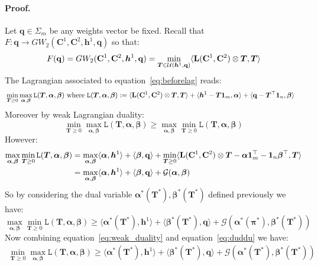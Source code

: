 \documentclass{article}
\newcommand{\scalar}[2]{\langle #1 , #2 \rangle}
\def\eqref#1{equation~\ref{#1}}
\def\vh{{\bm{h}}}
\def\mT{{\bm{T}}}
\def\alphab{\boldsymbol\alpha}
\def\betab{\boldsymbol\beta}
\def\G{\pi}
\def\GG{\boldsymbol\G}
\def\L{{\bf L}}
\def\one{{\mathbf{1}}}
\newcommand{\qbf}{\mathbf{q}}
\newcommand{\C}{\mathbf{C}}
\newcommand{\gw}{GW}
\begin{document}
	\paragraph{Proof.}
	Let $\qbf \in \Sigma_m$ be any weights vector be fixed. Recall that $F: \qbf \rightarrow \gw_2(\C^1,\C^2,\vh^1,\qbf)$ so that:
	\begin{equation}
	\label{eq:beforelag}
	F(\qbf)=\gw_2(\C^1,\C^2,\vh^1,\qbf)=\min_{\mT \in \mathcal{U}(\vh^1,\qbf)} \scalar{\L(\C^1,\C^2)\otimes \mT}{\mT}{}
	\end{equation}
	The Lagrangian associated to \eqref{eq:beforelag} reads:
	\begin{equation}
	\label{eq:lag_cond}
	\begin{split}
	&\min_{\mT \geq 0} \max_{\alphab,\betab} \texttt{L}(\mT,\alphab,\betab) \text{ where }\texttt{L}(\mT,\alphab,\betab):= \scalar{\L(\C^1,\C^2)\otimes \mT}{\mT}{}+ \scalar{\vh^1-\mT \one_m}{\alphab}{}+ \scalar{\qbf-\mT^{\top} \one_n}{\betab}{}
	\end{split}
	\end{equation}
	Moreover by weak Lagrangian duality:
	\begin{equation}
	\label{eq:weak_duality}
	\min_{\mT \geq 0} \max_{\alphab,\betab} \texttt{L}(\mT,\alphab,\betab) \geq \max_{\alphab,\betab} \min_{\mT \geq 0}  \texttt{L}(\mT,\alphab,\betab)
	\end{equation}
	However: 
	\begin{equation*}
	\begin{split}
	\max_{\alphab,\betab} \min_{\mT \geq 0}  \texttt{L}(\mT,\alphab,\betab)&=\max_{\alphab,\betab} \scalar{\alphab}{\vh^1}{}+\scalar{\betab}{\qbf}{}+ \min_{\mT \geq 0} \scalar{\L(\C^1,\C^2)\otimes \mT-\alphab \one_m^{\top}- \one_n\betab^{\top}}{\mT}{} \\
	&=\max_{\alphab,\betab} \scalar{\alphab}{\vh^1}{}+\scalar{\betab}{\qbf}{}+\mathcal{G}(\alphab,\betab)
	\end{split}
	\end{equation*}
	So by considering the dual variable $\alphab^{*}(\mT^{*}),\betab^{*}(\mT^{*})$ defined previously we have:
	\begin{equation}
	\label{eq:duddu}
	\max_{\alphab,\betab} \min_{\mT \geq 0}  \texttt{L}(\mT,\alphab,\betab)\geq \scalar{\alphab^{*}(\mT^{*})}{\vh^1}{}+\scalar{\betab^{*}(\mT^{*})}{\qbf}{}+\mathcal{G}(\alphab^{*}(\GG^{*}),\betab^{*}(\mT^{*}))
	\end{equation}
	Now combining \eqref{eq:weak_duality} and \eqref{eq:duddu} we have:
	\begin{equation}
	\begin{split}
	\min_{\mT \geq 0} \max_{\alphab,\betab} \texttt{L}(\mT,\alphab,\betab) \geq \scalar{\alphab^{*}(\mT^{*})}{\vh^1}{}+\scalar{\betab^{*}(\mT^{*})}{\qbf}{}+\mathcal{G}(\alphab^{*}(\mT^{*}),\betab^{*}(\mT^{*}))
	\end{split}
	\end{equation}
\end{document}
